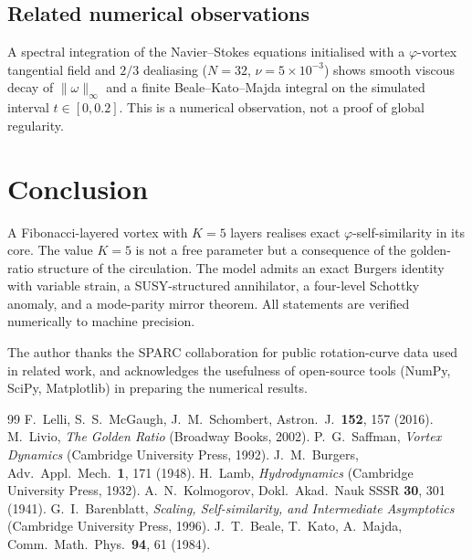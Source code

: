 \documentclass[twocolumn,aps,prfluids]{revtex4-2}
\newcommand{\phig}{\varphi}
\begin{document}
\subsection{Related numerical observations}

A spectral integration of the Navier--Stokes equations initialised
with a $\phig$-vortex tangential field and $2/3$ dealiasing
($N = 32$, $\nu = 5\times10^{-3}$) shows smooth viscous decay of
$\|\omega\|_\infty$ and a finite Beale--Kato--Majda integral on the
simulated interval $t\in[0,0.2]$. This is a numerical observation,
not a proof of global regularity.

\section{Conclusion}
\label{sec:conclusion}

A Fibonacci-layered vortex with $K=5$ layers realises exact
$\phig$-self-similarity in its core. The value $K=5$ is not a free
parameter but a consequence of the golden-ratio structure of the
circulation. The model admits an exact Burgers identity with variable
strain, a SUSY-structured annihilator, a four-level Schottky anomaly,
and a mode-parity mirror theorem. All statements are verified
numerically to machine precision.

\begin{acknowledgments}
The author thanks the SPARC collaboration for public rotation-curve
data used in related work, and acknowledges the usefulness of open-source
tools (NumPy, SciPy, Matplotlib) in preparing the numerical results.
\end{acknowledgments}

\begin{thebibliography}{99}
 F.~Lelli, S.~S.~McGaugh, J.~M.~Schombert,
  Astron.\ J.\ \textbf{152}, 157 (2016).
 M.~Livio, \emph{The Golden Ratio} (Broadway Books,
  2002).
 P.~G.~Saffman, \emph{Vortex Dynamics}
  (Cambridge University Press, 1992).
 J.~M.~Burgers, Adv.\ Appl.\ Mech.\ \textbf{1}, 171
  (1948).
 H.~Lamb, \emph{Hydrodynamics} (Cambridge University
  Press, 1932).
 A.~N.~Kolmogorov, Dokl.\ Akad.\ Nauk SSSR
  \textbf{30}, 301 (1941).
 G.~I.~Barenblatt, \emph{Scaling,
  Self-similarity, and Intermediate Asymptotics} (Cambridge University
  Press, 1996).
 J.~T.~Beale, T.~Kato, A.~Majda, Comm.\ Math.\ Phys.\
  \textbf{94}, 61 (1984).
\end{thebibliography}
\end{document}
